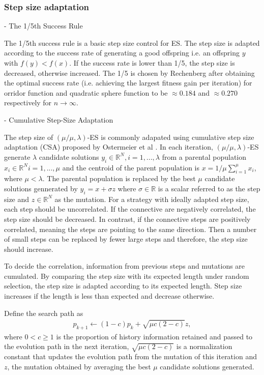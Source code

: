 \subsubsection{Step size adaptation}\hfill

- The 1/5th Success Rule

The 1/5th success rule is a basic step size control for ES. The step size is adapted according to the success rate of generating a good offspring i.e. an offspring $y$ with $f(y)<f(x)$. If the success rate is lower than 1/5, the step size is decreased, otherwise increased. The 1/5 is chosen by Rechenberg \cite{Rechenberg1973} after obtaining the optimal success rate (i.e. achieving the largest fitness gain per iteration) for orridor function and quadratic sphere function to be $\approx 0.184$ and $\approx 0.270$ respectively for $n \rightarrow \infty$.  


- Cumulative Step-Size Adaptation 

The step size of $(\mu/\mu,\lambda)$-ES is commonly adapated using cumulative step size adaptation (CSA) proposed by Ostermeier et al \cite{Ostermeier:1994:DAS:1326675.1326679}. In each iteration, $(\mu/\mu,\lambda)$-ES generate $\lambda$ candidate solutions $y_i \in \mathbb{R}^N,i=1,...,\lambda$ from a parental population $x_i \in \mathbb{R}^N i=1,...,\mu$ and the centroid of the parent population is $x = 1/\mu \sum_{i=1}^\mu x_i$, where $\mu < \lambda$. The parental population is replaced by the best $\mu$ candidate solutions gennerated by $y_i = x + \sigma z$ where $\sigma \in \mathbb{R}$ is a scalar referred to as the step size and $z \in \mathbb{R}^N$ as the mutation. For a strategy with ideally adapted step size, each step should be uncorrelated. If the connective are negatively correlated, the step size should be decreased. In contrast, if the connective steps are positively correlated, meaning the steps are pointing to the same direction. Then a number of small steps can be replaced by fewer large steps and therefore, the step size should increase. 

To decide the correlation, information from previous steps and mutations are cumulated. By comparing the step size with its expected length under random selection, the step size is adapted according to its expected length. Step size increases if the length is less than expected and decrease otherwise. 

Define the search path as 
\begin{align}
p_{k+1} \leftarrow (1-c)p_k + \sqrt{\mu c (2-c)} z,
\end{align}
where $0<c \geq 1$ is the proportion of history information retained and passed to the evolution path in the next iteration, $ \sqrt{\mu c (2-c)}$ is a normalization constant that updates the evolution path from the mutation of this iteration and $z$, the mutation obtained by averaging the best $\mu$ candidate solutions generated. 

